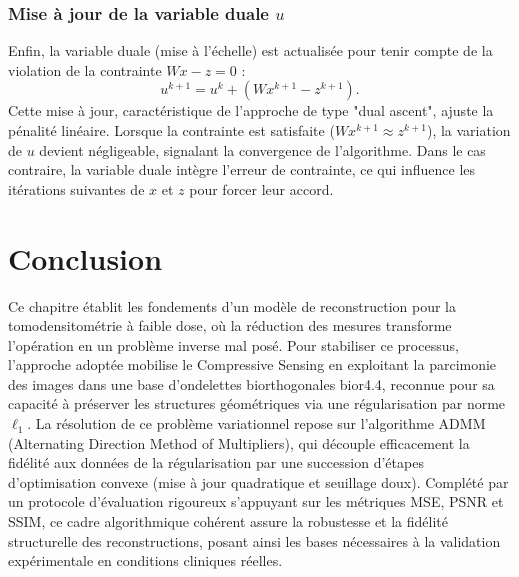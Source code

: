\subsubsection*{Mise à jour de la variable duale \(u\)}
Enfin, la variable duale (mise à l'échelle) est actualisée pour tenir compte de la violation de la contrainte \(Wx - z = 0\) :
\begin{equation}
u^{k+1} = u^{k} + \left(Wx^{k+1} - z^{k+1}\right).
\end{equation}
Cette mise à jour, caractéristique de l'approche de type "dual ascent", ajuste la pénalité linéaire. Lorsque la contrainte est satisfaite (\(Wx^{k+1} \approx z^{k+1}\)), la variation de \(u\) devient négligeable, signalant la convergence de l'algorithme. Dans le cas contraire, la variable duale intègre l'erreur de contrainte, ce qui influence les itérations suivantes de \(x\) et \(z\) pour forcer leur accord.

\section*{Conclusion}
Ce chapitre établit les fondements d'un modèle de reconstruction pour la tomodensitométrie à faible dose, où la réduction des mesures transforme l'opération en un problème inverse mal posé. Pour stabiliser ce processus, l'approche adoptée mobilise le Compressive Sensing en exploitant la parcimonie des images dans une base d'ondelettes biorthogonales bior4.4, reconnue pour sa capacité à préserver les structures géométriques via une régularisation par norme $\ell_1$. La résolution de ce problème variationnel repose sur l'algorithme ADMM (Alternating Direction Method of Multipliers), qui découple efficacement la fidélité aux données de la régularisation par une succession d'étapes d'optimisation convexe (mise à jour quadratique et seuillage doux). Complété par un protocole d'évaluation rigoureux s'appuyant sur les métriques MSE, PSNR et SSIM, ce cadre algorithmique cohérent assure la robustesse et la fidélité structurelle des reconstructions, posant ainsi les bases nécessaires à la validation expérimentale en conditions cliniques réelles.